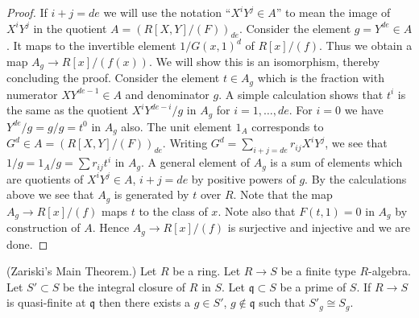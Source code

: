 \begin{proof}
\medskip\noindent
If $i + j = de$ we will use the notation ``$X^iY^j \in A$'' to mean
the image of $X^iY^j$ in the quotient $A = (R[X, Y]/(F))_{de}$.
Consider the element $g = Y^{de} \in A$.
It maps to the invertible element $1/G(x, 1)^d$ of
$R[x]/(f)$. Thus we obtain a map $A_g \to R[x]/(f(x))$.
We will show this is an isomorphism, thereby concluding the proof.
Consider the element $t \in A_g$ which is the fraction
with numerator $XY^{de - 1} \in A$ and denominator $g$.
A simple calculation shows that $t^i$ is the same
as the quotient $X^i Y^{de-i}/g$ in $A_g$ for
$i = 1, \ldots, de$. For $i = 0$ we have $Y^{de}/g = g/g = t^0$
in $A_g$ also.
The unit element $1_A$ corresponds to $G^d \in A = (R[X, Y]/(F))_{de}$.
Writing $G^d = \sum_{i + j = de} r_{ij}X^iY^j$,
we see that $1/g = 1_A/g = \sum r_{ij}t^i$ in $A_g$.
A general element of $A_g$ is a sum of elements which are
quotients of $X^iY^j \in A$, $i + j = de$ by positive
powers of $g$. By the calculations above
we see that $A_g$ is generated by $t$ over $R$.
Note that the map $A_g \to R[x]/(f)$ maps $t$ to the
class of $x$. Note also that $F(t, 1) = 0$ in $A_g$ by construction
of $A$. Hence $A_g \to R[x]/(f)$ is surjective and injective
and we are done.
\end{proof}

\begin{theorem}
\label{theorem-main-theorem}
(Zariski's Main Theorem.)
Let $R$ be a ring. Let $R \to S$ be a finite type $R$-algebra.
Let $S' \subset S$ be the integral closure of $R$ in $S$.
Let $\mathfrak q \subset S$ be a prime of $S$.
If $R \to S$ is quasi-finite at $\mathfrak q$ then
there exists a $g \in S'$, $g \not \in \mathfrak q$
such that $S'_g \cong S_g$.
\end{theorem}

